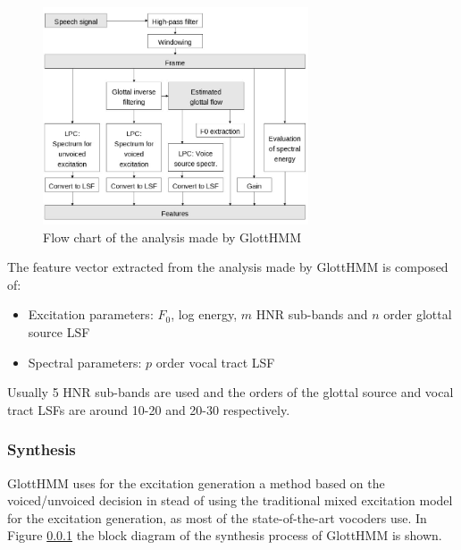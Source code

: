 \begin{figure}[!htb]
\begin{centering}
\includegraphics[width=0.7\textwidth]{images/glott_analysis.jpg}
\caption{Flow chart of the analysis made by GlottHMM \cite{TuomoMSc}}
\label{fig:glott_analysis}
\end{centering}
\end{figure}

The feature vector extracted from the analysis made by GlottHMM is composed of:

\begin{itemize}
	\item Excitation parameters: $F_{0}$, log energy, $m$ HNR sub-bands and $n$ order glottal source LSF
	\item Spectral parameters: $p$ order vocal tract LSF
\end{itemize}

Usually 5 HNR sub-bands are used and the orders of the glottal source and vocal tract LSFs are around 10-20 and 20-30 respectively.

\subsubsection{Synthesis}
\label{vocoders_glott_synthesis}
GlottHMM uses for the excitation generation a method based on the voiced/unvoiced decision in stead of using the traditional mixed excitation model for the excitation generation, as most of the state-of-the-art vocoders use. In Figure \ref{vocoders_glott_synthesis} the block diagram of the synthesis process of GlottHMM is shown.


